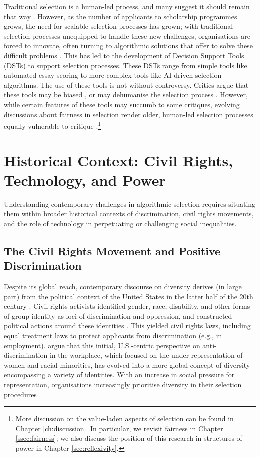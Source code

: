 Traditional selection is a human-led process, and many suggest it should remain that way \cite{Latzer_Hollnbuchner_Just_Saurwein_2014}. However, as the number of applicants to scholarship programmes grows, the need for scalable selection processes has grown; with traditional selection processes unequipped to handle these new challenges, organisations are forced to innovate, often turning to algorithmic solutions that offer to solve these difficult problems \cite{Latzer_Hollnbuchner_Just_Saurwein_2014}. This has led to the development of Decision Support Tools (DSTs) to support selection processes. These DSTs range from simple tools like automated essay scoring to more complex tools like AI-driven selection algorithms. The use of these tools is not without controversy. Critics argue that these tools may be biased \cite{dwork_fairness_2012}, or may dehumanise the selection process \cite{binns_its_2018}. However, while certain features of these tools may succumb to some critiques, evolving discussions about fairness in selection render older, human-led selection processes equally vulnerable to critique \cite{Ahnaf2023AHPAP,pmlr-v80-kearns18a}.\footnote{More discussion on the value-laden aspects of selection can be found in Chapter \ref{ch:discussion}. In particular, we revisit fairness in Chapter \ref{ssec:fairness}; we also discuss the position of this research in structures of power in Chapter \ref{sec:reflexivity}.}

\section{Historical Context: Civil Rights, Technology, and Power}\label{sec:historical_context}

Understanding contemporary challenges in algorithmic selection requires situating them within broader historical contexts of discrimination, civil rights movements, and the role of technology in perpetuating or challenging social inequalities.

\subsection{The Civil Rights Movement and Positive Discrimination}\label{ssec:civil_rights}
Despite its global reach, contemporary discourse on diversity derives (in large part) from the political context of the United States in the latter half of the 20th century \cite{nkomo2019diversity}. Civil rights activists identified gender, race, disability, and other forms of group identity as loci of discrimination and oppression, and constructed political actions around these identities \cite{morris1984origins}. This yielded civil rights laws, including equal treatment laws to protect applicants from discrimination (e.g., in employment). \textcite{nkomo2019diversity} argue that this initial, U.S.-centric perspective on anti-discrimination in the workplace, which focused on the under-representation of women and racial minorities, has evolved into a more global concept of diversity encompassing a variety of identities. With an increase in social pressure for representation, organisations increasingly prioritise diversity in their selection procedures \cite{hsieh2019allocation,minkin2023diversity}.

